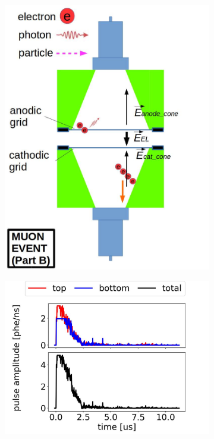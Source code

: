 \begin{figure}[!htbp]
\begin{subfigure}[b]{.8\textwidth}
		\includegraphics[width=\halfwidth,clip,trim={0 0 0 0}]{Figures/GasTest/WeiDrawEvent/MuonEventB.jpg}
		\caption{}
		\label{fig:muon EL b}
	\end{subfigure}
	\par\bigskip
	\begin{subfigure}[b]{0.6\textwidth}
		\centering
		\includegraphics[width=\figurewidth,clip,trim={0 0 0 0}]{Figures/GasTest/exampleWaveforms/proc64767id00000107.jpg}

\end{subfigure}
\end{figure}
